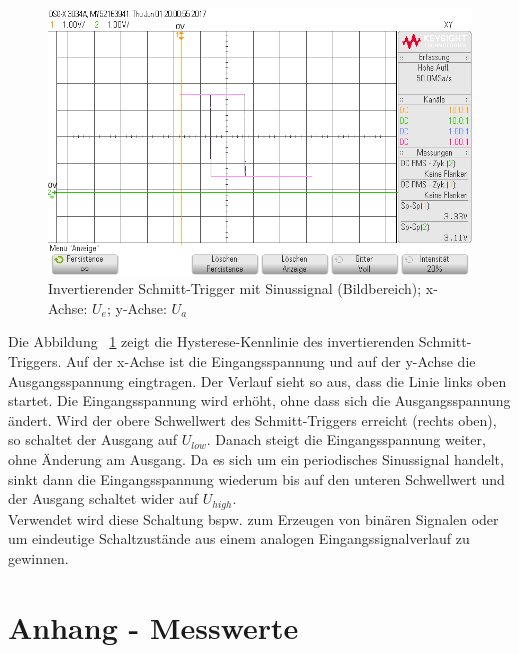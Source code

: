 \documentclass[12pt,a4paper,titlepage]{article}
\begin{document}
\begin{figure}[H]
  \centering
  \includegraphics[width=150mm]{i_schmitt_trigger_hysterese_kennlinie.png}
  \caption{Invertierender Schmitt-Trigger mit Sinussignal (Bildbereich); x-Achse: $U_e$; y-Achse: $U_a$}
  \label{figure44}
\end{figure}
\noindent Die Abbildung ~\ref{figure44} zeigt die Hysterese-Kennlinie des invertierenden Schmitt-Triggers. Auf der x-Achse ist die Eingangsspannung und auf der y-Achse die Ausgangsspannung eingtragen. Der Verlauf sieht so aus, dass die Linie links oben startet. Die Eingangsspannung wird erh\"oht, ohne dass sich die Ausgangsspannung \"andert. Wird der obere Schwellwert des Schmitt-Triggers erreicht (rechts oben), so schaltet der Ausgang auf $U_{low}$. Danach steigt die Eingangsspannung weiter, ohne \"Anderung am Ausgang. Da es sich um ein periodisches Sinussignal handelt, sinkt dann die Eingangsspannung wiederum bis auf den unteren Schwellwert und der Ausgang schaltet wider auf $U_{high}$. \\
\noindent Verwendet wird diese Schaltung bspw. zum Erzeugen von bin\"aren Signalen oder um eindeutige Schaltzustände aus einem analogen Eingangssignalverlauf zu gewinnen.



\section{Anhang - Messwerte}
\end{document}
